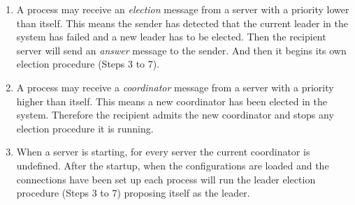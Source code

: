 \documentclass[dareport.tex]{subfiles}
\begin{document}
\begin{enumerate}[leftmargin=*]
	\item A process may receive an \emph{election} message from a server with a priority lower than itself. This means the sender has detected that the current leader in the system has failed and a new leader has to be elected. Then the recipient server will send an \emph{answer} message to the sender. And then it begins its own election procedure (Steps 3 to 7).
	\item A process may receive a \emph{coordinator} message from a server with a priority higher than itself. This means a new coordinator has been elected in the system. Therefore the recipient admits the new coordinator and stops any election procedure it is running.
	\item When a server is starting, for every server the current coordinator is undefined. After the startup, when the configurations are loaded and the connections have been set up each process will run the leader election procedure (Steps 3 to 7) proposing itself as the leader.
\end{enumerate}
\end{document}
